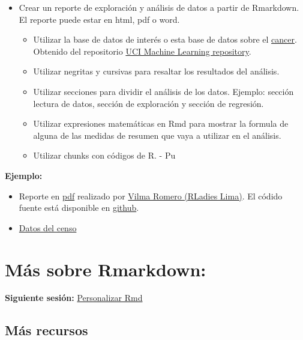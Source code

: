\documentclass[
]{article}
\providecommand{\tightlist}{%
  \setlength{\itemsep}{0pt}\setlength{\parskip}{0pt}}
\begin{document}
\begin{itemize}
\tightlist
\item
  Crear un reporte de exploración y análisis de datos a partir de
  Rmarkdown. El reporte puede estar en html, pdf o word.

  \begin{itemize}
  \tightlist
  \item
    Utilizar la base de datos de interés o esta base de datos sobre el
    \href{/datos/breast-cancer.data}{cancer}. Obtenido del repositorio
    \href{https://archive.ics.uci.edu/ml/datasets/Breast+Cancer+Wisconsin+(Diagnostic)}{UCI
    Machine Learning repository}.
  \item
    Utilizar negritas y cursivas para resaltar los resultados del
    análisis.
  \item
    Utilizar secciones para dividir el análisis de los datos. Ejemplo:
    sección lectura de datos, sección de exploración y sección de
    regresión.
  \item
    Utilizar expresiones matemáticas en Rmd para mostrar la formula de
    alguna de las medidas de resumen que vaya a utilizar en el análisis.
  \item
    Utilizar chunks con códigos de R. - Pu
  \end{itemize}
\end{itemize}

\textbf{Ejemplo:}

\begin{itemize}
\tightlist
\item
  Reporte en
  \href{https://github.com/VilmaRomero/R-Ladies-Lima-rmarkdown/raw/master/reporte/Censo.pdf}{pdf}
  realizado por \href{https://vilmaromero.github.io/}{Vilma Romero
  (RLadies Lima)}. El códido fuente está disponible en
  \href{https://github.com/VilmaRomero/R-Ladies-Lima-rmarkdown/blob/master/reporte/Censo.Rmd}{github}.
\item
  \href{datos/Cap_100_Infraestructura\%202017.sav}{Datos del censo}
\end{itemize}

\hypertarget{muxe1s-sobre-rmarkdown}{%
\section{Más sobre Rmarkdown:}\label{muxe1s-sobre-rmarkdown}}

\textbf{Siguiente sesión:} \href{personalizar.html}{Personalizar Rmd}

\hypertarget{muxe1s-recursos}{%
\subsection{Más recursos}\label{muxe1s-recursos}}
\end{document}
